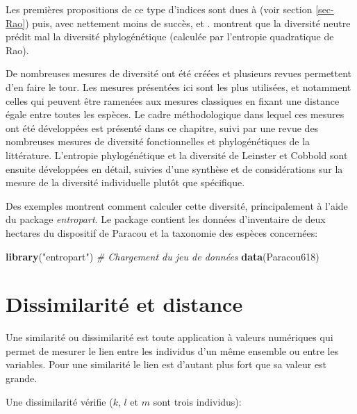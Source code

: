 \documentclass[
  11pt,
  french,
  a4paper,
  extrafontsizes,onecolumn,openright
  ]{memoir}
\newenvironment{Shaded}{\begin{snugshade}}{\end{snugshade}}
\newcommand{\CommentTok}[1]{\textcolor[rgb]{0.56,0.35,0.01}{\textit{#1}}}
\newcommand{\KeywordTok}[1]{\textcolor[rgb]{0.13,0.29,0.53}{\textbf{#1}}}
\newcommand{\NormalTok}[1]{#1}
\newcommand{\StringTok}[1]{\textcolor[rgb]{0.31,0.60,0.02}{#1}}
\begin{document}
Les premières propositions de ce type d'indices sont dues à \textcite{Rao1982} (voir section \ref{sec-Rao}) puis, avec nettement moins de succès, \textcite{Vane-Wright1991} et \textcite{Warwick1995}.
\textcite{Chave2007} montrent que la diversité neutre prédit mal la diversité phylogénétique (calculée par l'entropie quadratique de Rao).

De nombreuses mesures de diversité ont été créées et plusieurs revues permettent d'en faire le tour. \autocite{Ricotta2007,Vellend2010}
Les mesures présentées ici sont les plus utilisées, et notamment celles qui peuvent être ramenées aux mesures classiques en fixant une distance égale entre toutes les espèces.
Le cadre méthodologique dans lequel ces mesures ont été développées est présenté dans ce chapitre, suivi par une revue des nombreuses mesures de diversité fonctionnelles et phylogénétiques de la littérature.
L'entropie phylogénétique et la diversité de Leinster et Cobbold sont ensuite développées en détail, suivies d'une synthèse et de considérations sur la mesure de la diversité individuelle plutôt que spécifique.

Des exemples montrent comment calculer cette diversité, principalement à l'aide du package \emph{entropart}.
Le package contient les données d'inventaire de deux hectares du dispositif de Paracou et la taxonomie des espèces concernées:

\scriptsize

\begin{Shaded}
\begin{Highlighting}[]
\KeywordTok{library}\NormalTok{(}\StringTok{"entropart"}\NormalTok{)}
\CommentTok{# Chargement du jeu de données}
\KeywordTok{data}\NormalTok{(Paracou618)}
\end{Highlighting}
\end{Shaded}

\normalsize

\hypertarget{dissimilarituxe9-et-distance}{%
\section{Dissimilarité et distance}\label{dissimilarituxe9-et-distance}}

Une similarité ou dissimilarité est toute application à valeurs numériques qui permet de mesurer le lien entre les individus d'un même ensemble ou entre les variables.
Pour une similarité le lien est d'autant plus fort que sa valeur est grande.

Une dissimilarité vérifie (\(k\), \(l\) et \(m\) sont trois individus):
\end{document}

